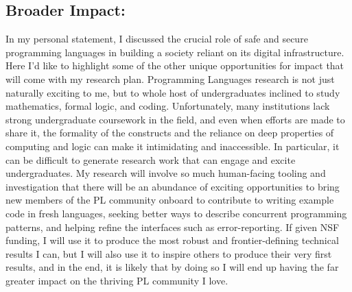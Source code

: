 \documentclass{nsf-grfp}
\begin{document}
\subsection*{Broader Impact:} In my personal statement, I discussed the crucial role of safe and secure programming languages in building a society reliant on its digital infrastructure. Here I'd like to highlight some of the other unique opportunities for impact that will come with my research plan. Programming Languages research is not just naturally exciting to me, but to whole host of undergraduates inclined to study mathematics, formal logic, and coding. Unfortunately, many institutions lack strong undergraduate coursework in the field, and even when efforts are made to share it, the formality of the constructs and the reliance on deep properties of computing and logic can make it intimidating and inaccessible. In particular, it can be difficult to generate research work that can engage and excite undergraduates. My research will involve so much human-facing tooling and investigation that there will be an abundance of exciting opportunities to bring new members of the PL community onboard to contribute to writing example code in fresh languages, seeking better ways to describe concurrent programming patterns, and helping refine the interfaces such as error-reporting. If given NSF funding, I will use it to produce the most robust and frontier-defining technical results I can, but I will also use it to inspire others to produce their very first results, and in the end, it is likely that by doing so I will end up having the far greater impact on the thriving PL community I love.
\end{document}
